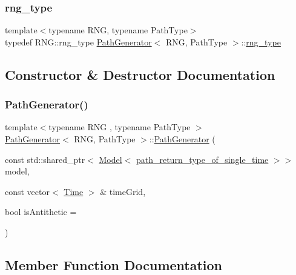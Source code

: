\hypertarget{class_path_generator_a7e71cbb5376b07b319b1f042a1035335}{}\label{class_path_generator_a7e71cbb5376b07b319b1f042a1035335} 
\subsubsection{\texorpdfstring{rng\+\_\+type}{rng\_type}}
{\footnotesize\ttfamily template$<$typename R\+NG, typename Path\+Type$>$ \\
typedef R\+N\+G\+::rng\+\_\+type \hyperlink{class_path_generator}{Path\+Generator}$<$ R\+NG, Path\+Type $>$\+::\hyperlink{class_path_generator_a7e71cbb5376b07b319b1f042a1035335}{rng\+\_\+type}}



\subsection{Constructor \& Destructor Documentation}
\hypertarget{class_path_generator_af6c5d75655e077378f702248f84e2920}{}\label{class_path_generator_af6c5d75655e077378f702248f84e2920} 
\subsubsection{\texorpdfstring{Path\+Generator()}{PathGenerator()}}
{\footnotesize\ttfamily template$<$typename R\+NG , typename Path\+Type $>$ \\
\hyperlink{class_path_generator}{Path\+Generator}$<$ R\+NG, Path\+Type $>$\+::\hyperlink{class_path_generator}{Path\+Generator} (\begin{DoxyParamCaption}\item[{const std\+::shared\+\_\+ptr$<$ \hyperlink{class_model}{Model}$<$ \hyperlink{class_path_generator_a467bc3ddaa5e9104170550617e767349}{path\+\_\+return\+\_\+type\+\_\+of\+\_\+single\+\_\+time} $>$$>$}]{model,  }\item[{const vector$<$ \hyperlink{_name_def_8h_ac2d3e0ba793497bcca555c7c2cf64ff3}{Time} $>$ \&}]{time\+Grid,  }\item[{bool}]{is\+Antithetic = {} }\end{DoxyParamCaption})}



\subsection{Member Function Documentation}
\hypertarget{class_path_generator_aa90d7cd4206c42ac84b1ad7ee8660950}{}\label{class_path_generator_aa90d7cd4206c42ac84b1ad7ee8660950} 

